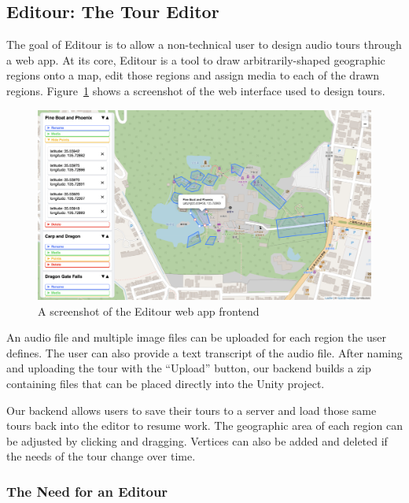\documentclass[a4paper, 10pt, american, titlepage]{article}
\begin{document}
\subsection{Editour: The Tour Editor}
\label{sec:editour}

The goal of Editour is to allow a non-technical user to design audio tours
through a web app. At its core, Editour is a tool to draw arbitrarily-shaped
geographic regions onto a map, edit those regions and assign media to each of
the drawn regions. Figure~\ref{fig:editour} shows a screenshot of the web
interface used to design tours.

\begin{figure}[h]
	\centering
	\includegraphics[width=\textwidth]{updated-editour.png}
	\caption{A screenshot of the Editour web app frontend}
	\label{fig:editour}
\end{figure}

An audio file and multiple image files can be uploaded for each region the user
defines. The user can also provide a text transcript of the audio file. After
naming and uploading the tour with the ``Upload'' button, our backend builds a
zip containing files that can be placed directly into the Unity project.

Our backend allows users to save their tours to a server and load those same
tours back into the editor to resume work. The geographic area of each region
can be adjusted by clicking and dragging. Vertices can also be added and
deleted if the needs of the tour change over time.

\subsubsection{The Need for an Editour}
\label{sec:theNeedForAnEditour}
\end{document}
